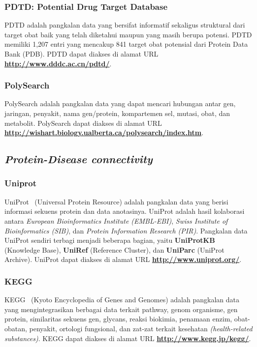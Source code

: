 		\subsubsection{PDTD: Potential Drug Target Database} \label{pdtd}
		PDTD adalah pangkalan data yang bersifat informatif sekaligus struktural dari target obat baik yang telah diketahui maupun yang masih berupa potensi. PDTD memiliki 1,207 entri yang mencakup 841 target obat potensial dari Protein Data Bank (PDB). PDTD dapat diakses di alamat URL \textbf{\url{http://www.dddc.ac.cn/pdtd/}}.

		\subsubsection{PolySearch} \label{polysearch}
		PolySearch adalah pangkalan data yang dapat mencari hubungan antar gen, jaringan, penyakit, nama gen/protein, kompartemen sel, mutasi, obat, dan metabolit. PolySearch dapat diakses di alamat URL \textbf{\url{http://wishart.biology.ualberta.ca/polysearch/index.htm}}.

	\subsection{\emph{Protein-Disease connectivity}}
		\subsubsection{Uniprot} \label{uniprot}
		UniProt~\cite{pmid25348405} (Universal Protein Resource) adalah pangkalan data yang berisi informasi sekuens protein dan data anotasinya. UniProt adalah hasil kolaborasi antara \emph{European Bioinformatics Institute (EMBL-EBI)}, \emph{Swiss Institute of Bioinformatics (SIB)}, dan \emph{Protein Information Research (PIR)}. Pangkalan data UniProt sendiri terbagi menjadi beberapa bagian, yaitu \textbf{UniProtKB} (Knowledge Base), \textbf{UniRef} (Reference Cluster), dan \textbf{UniParc} (UniProt Archive). UniProt dapat diakses di alamat URL \textbf{\url{http://www.uniprot.org/}}.

		\subsubsection{KEGG} \label{kegg}
		KEGG~\cite{pmid22080510} (Kyoto Encyclopedia of Genes and Genomes) adalah pangkalan data yang mengintegrasikan berbagai data terkait pathway, genom organisme, gen protein, similaritas sekuens gen, glycans, reaksi biokimia, penamaan enzim, obat-obatan, penyakit, ortologi fungsional, dan zat-zat terkait kesehatan \emph{(health-related substances)}. KEGG dapat diakses di alamat URL \textbf{\url{http://www.kegg.jp/kegg/}}.

